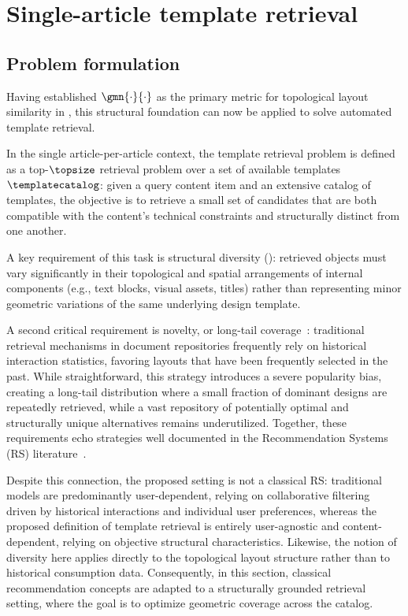 \section{Single-article template retrieval}
\label{section:template-retrieval-single-article}

\subsection{Problem formulation}
\label{sec:trs-problem-formulation}

Having established $\gmn{\cdot}{\cdot}$ as the primary metric for topological layout similarity in , this structural foundation can now be applied to solve automated template retrieval.

In the single article-per-article context, the template retrieval problem is defined as a top-$\topsize$ retrieval problem over a set of available templates $\templatecatalog$: given a query content item and an extensive catalog of templates, the objective is to retrieve a small set of candidates that are both compatible with the content's technical constraints and structurally distinct from one another. 

A key requirement of this task is structural diversity (): retrieved objects must vary significantly in their topological and spatial arrangements of internal components (e.g., text blocks, visual assets, titles) rather than representing minor geometric variations of the same underlying design template.

A second critical requirement is novelty, or long-tail coverage~\cite{longtail}: traditional retrieval mechanisms in document repositories frequently rely on historical interaction statistics, favoring layouts that have been frequently selected in the past. While straightforward, this strategy introduces a severe popularity bias, creating a long-tail distribution where a small fraction of dominant designs are repeatedly retrieved, while a vast repository of potentially optimal and structurally unique alternatives remains underutilized. Together, these requirements echo strategies well documented in the Recommendation Systems (RS) literature~\cite{BOBADILLA2013109,vrijenhoek-diversity-2024}.


\begin{callout}
Despite this connection, the proposed setting is not a classical RS: traditional models are predominantly user-dependent, relying on collaborative filtering driven by historical interactions and individual user preferences, whereas the proposed definition of template retrieval is entirely user-agnostic and content-dependent, relying on objective structural characteristics. Likewise, the notion of diversity here applies directly to the topological layout structure rather than to historical consumption data. Consequently, in this section, classical recommendation concepts are adapted to a structurally grounded retrieval setting, where the goal is to optimize geometric coverage across the catalog.
\end{callout}

